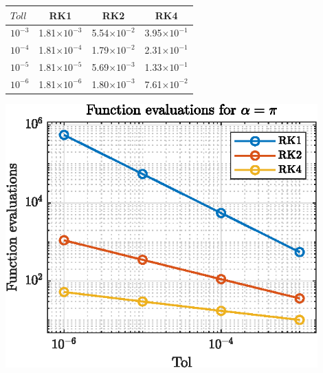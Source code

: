 \documentclass[11pt,a4paper,oneside]{article}
\begin{document}
\begin{minipage}{0.50\textwidth}
    \centering
    \begin{center}
        \captionsetup{type=table}
        \begin{tabular}{lccc}               %
            \toprule
            \toprule
            $Toll$ & RK1& RK2& RK4\\ 
            \midrule                    
            $10^{-3}$& 1.81$\times 10^{-3}$ & 5.54$\times 10^{-2}$ & 3.95$\times 10^{-1}$\\
            $10^{-4}$& 1.81$\times 10^{-4}$ & 1.79$\times 10^{-2}$ & 2.31$\times 10^{-1}$\\
            $10^{-5}$& 1.81$\times 10^{-5}$ & 5.69$\times 10^{-3}$ & 1.33$\times 10^{-1}$\\
            $10^{-6}$& 1.81$\times 10^{-6}$ & 1.80$\times 10^{-3}$ & 7.61$\times 10^{-2}$\\
            \bottomrule
            \bottomrule
        \end{tabular}
    \end{center}
\end{minipage}
\hfill
\begin{minipage}{0.45\textwidth}
    \centering
    \begin{center}
        \includegraphics[width=0.9\textwidth]{ex4_feval.eps}
        \captionsetup{type=figure}
    \end{center}
\end{minipage}
\end{document}
